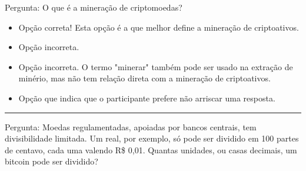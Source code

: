 Pergunta: O que é a mineração de criptomoedas?
\begin{itemize}

	\item {}

 Opção correta! Esta opção é a que melhor define a mineração de criptoativos.
 
	\item {}
	
	Opção incorreta.
	
	\item {} 
	
	Opção incorreta. O termo "minerar" também pode ser usado na extração de minério, mas não tem relação direta com a mineração de criptoativos.
	 
	\item {}
	
	Opção que indica que o participante prefere não arriscar uma resposta.
	
\end{itemize}

\rule{\linewidth}{0.5mm} 

Pergunta: Moedas regulamentadas, apoiadas por bancos centrais, tem divisibilidade limitada. Um real, por exemplo, só pode ser dividido em 100 partes de
centavo, cada uma valendo R\$ 0,01. Quantas unidades, ou casas decimais, um bitcoin pode ser dividido?

